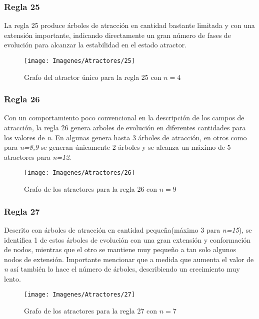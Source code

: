 \documentclass[]{article}
\begin{document}
			
			\newpage
			\subsubsection{Regla 25}
				\justifying	
				La regla 25 produce árboles de atracción en cantidad bastante limitada y con una extensión importante, indicando directamente un gran número de fases de evolución para alcanzar la estabilidad en el estado atractor.
				
				
				\hfill\break
				\hfill\break
				\hfill\break
				\begin{figure}[!h]
					\centering
					\texttt{[image: Imagenes/Atractores/25]}
					\caption{Grafo del atractor único para la regla 25 con $n=4$}
					\label{Regla_25}
				\end{figure}
				
			
			\newpage
			\subsubsection{Regla 26}
				\justifying	
				Con un comportamiento poco convencional en la descripción de los campos de atracción, la regla 26 genera arboles de evolución en diferentes cantidades para los valores de \textit{n}. En algunas genera hasta 3 árboles de atracción, en otros como para \textit{n=8,9} se generan únicamente 2 árboles y se alcanza un máximo de 5 atractores para \textit{n=12}.
				
				
				\hfill\break
				\hfill\break
				\hfill\break
				\begin{figure}[!h]
					\centering
					\texttt{[image: Imagenes/Atractores/26]}
					\caption{Grafo de los atractores para la regla 26 con $n=9$}
					\label{Regla_26}
				\end{figure}
				
			
			\newpage
			\subsubsection{Regla 27}
				\justifying	
				Descrito con árboles de atracción en cantidad pequeña(máximo 3 para \textit{n=15}), se identifica 1 de estos árboles de evolución con una gran extensión y conformación de nodos, mientras que el otro se mantiene muy pequeño a tan solo algunos nodos de extensión. Importante mencionar que a medida que aumenta el valor de \textit{n} así también lo hace el número de árboles, describiendo un crecimiento muy lento.
				
				\hfill\break
				\hfill\break
				\hfill\break
				\begin{figure}[!h]
					\centering
					\texttt{[image: Imagenes/Atractores/27]}
					\caption{Grafo de los atractores para la regla 27 con $n=7$}
					\label{Regla_27}
				\end{figure}
				
\end{document}

